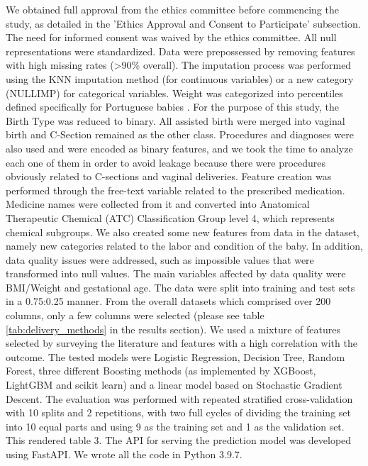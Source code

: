 


We obtained full approval from the ethics committee before commencing the study, as detailed in the 'Ethics Approval and Consent to Participate' subsection. The need for informed consent was waived by the ethics committee. All null representations were standardized. Data were prepossessed by removing features with high missing rates (>90\% overall). The imputation process was performed using the KNN imputation method (for continuous variables) or a new category (NULLIMP) for categorical variables. Weight was categorized into percentiles defined specifically for Portuguese babies \cite{sousa-santosDevelopmentBirthweightStandard2016}. For the purpose of this study, the Birth Type was reduced to binary. All assisted birth were merged into vaginal birth and C-Section remained as the other class. Procedures and diagnoses were also used and were encoded as binary features, and we took the time to analyze each one of them in order to avoid leakage because there were procedures obviously related to C-sections and vaginal deliveries. Feature creation was performed through the free-text variable related to the prescribed medication. Medicine names were collected from it and converted into Anatomical Therapeutic Chemical (ATC) Classification Group level 4, which represents chemical subgroups. We also created some new features from data in the dataset, namely new categories related to the labor and condition of the baby. In addition, data quality issues were addressed, such as impossible values that were transformed into null values. The main variables affected by data quality were BMI/Weight and gestational age. The data were split into training and test sets in a 0.75:0.25 manner. From the overall datasets which comprised over 200 columns, only a few columns were selected (please see table \ref{tab:delivery_methods} in the results section). We used a mixture of features selected by surveying the literature \cite{irwindaMaternalFetalCharacteristics2021,deramonfernandezPredictionModeDelivery2022,parveenAnalysisCesareanSections2021} and features with a high correlation with the outcome. The tested models were Logistic Regression, Decision Tree, Random Forest, three different Boosting methods (as implemented by XGBoost, LightGBM and scikit learn) and a linear model based on Stochastic Gradient Descent. The evaluation was performed with repeated stratified cross-validation with 10 splits and 2 repetitions, with two full cycles of dividing the training set into 10 equal parts and using 9 as the training set and 1 as the validation set. This rendered table 3. The API for serving the prediction model was developed using FastAPI. We wrote all the code in Python 3.9.7.